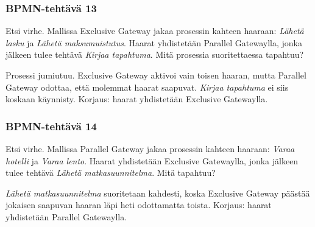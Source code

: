 \documentclass[
  finnish,
  letterpaper,
  DIV=11,
  numbers=noendperiod,
  oneside]{scrreprt}
\begin{document}
\subsubsection{BPMN-tehtävä 13}\label{bpmn-tehtuxe4vuxe4-13}

Etsi virhe. Mallissa Exclusive Gateway jakaa prosessin kahteen haaraan:
\emph{Lähetä lasku} ja \emph{Lähetä maksumuistutus}. Haarat yhdistetään
Parallel Gatewaylla, jonka jälkeen tulee tehtävä \emph{Kirjaa
tapahtuma}. Mitä prosessia suoritettaessa tapahtuu?

\begin{tcolorbox}[enhanced jigsaw, arc=.35mm, bottomrule=.15mm, bottomtitle=1mm, breakable, colback=white, colbacktitle=quarto-callout-tip-color!10!white, colframe=quarto-callout-tip-color-frame, coltitle=black, left=2mm, leftrule=.75mm, opacityback=0, opacitybacktitle=0.6, rightrule=.15mm, title=\textcolor{quarto-callout-tip-color}{\faLightbulb}\hspace{0.5em}{Malliratkaisu}, titlerule=0mm, toprule=.15mm, toptitle=1mm]

Prosessi jumiutuu. Exclusive Gateway aktivoi vain toisen haaran, mutta
Parallel Gateway odottaa, että molemmat haarat saapuvat. \emph{Kirjaa
tapahtuma} ei siis koskaan käynnisty. Korjaus: haarat yhdistetään
Exclusive Gatewaylla.

\end{tcolorbox}

\subsubsection{BPMN-tehtävä 14}\label{bpmn-tehtuxe4vuxe4-14}

Etsi virhe. Mallissa Parallel Gateway jakaa prosessin kahteen haaraan:
\emph{Varaa hotelli} ja \emph{Varaa lento}. Haarat yhdistetään Exclusive
Gatewaylla, jonka jälkeen tulee tehtävä \emph{Lähetä matkasuunnitelma}.
Mitä tapahtuu?

\begin{tcolorbox}[enhanced jigsaw, arc=.35mm, bottomrule=.15mm, bottomtitle=1mm, breakable, colback=white, colbacktitle=quarto-callout-tip-color!10!white, colframe=quarto-callout-tip-color-frame, coltitle=black, left=2mm, leftrule=.75mm, opacityback=0, opacitybacktitle=0.6, rightrule=.15mm, title=\textcolor{quarto-callout-tip-color}{\faLightbulb}\hspace{0.5em}{Malliratkaisu}, titlerule=0mm, toprule=.15mm, toptitle=1mm]

\emph{Lähetä matkasuunnitelma} suoritetaan kahdesti, koska Exclusive
Gateway päästää jokaisen saapuvan haaran läpi heti odottamatta toista.
Korjaus: haarat yhdistetään Parallel Gatewaylla.

\end{tcolorbox}
\end{document}
